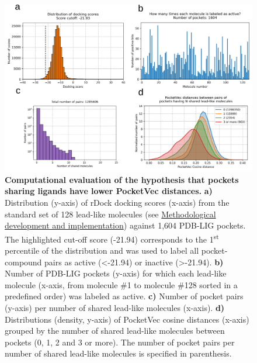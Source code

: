 \begin{figure}[htbp]
  \centering
  \includegraphics[width=1\linewidth]{figures/PocketVec/Supplementary/FigS26.png} 
  \caption{
  \textbf{Computational evaluation of the hypothesis that pockets sharing ligands have lower PocketVec distances.}
  \textbf{a)} Distribution (y-axis) of rDock\cite{ruiz-carmona_rdock_2014} docking scores (x-axis) from the standard set of 128 lead-like molecules (see \hyperref[PocketVec_MethDevAndImp]{Methodological development and implementation}) against 1,604 PDB-LIG pockets. The highlighted cut-off score (-21.94) corresponds to the 1\textsuperscript{st} percentile of the distribution and was used to label all pocket-compound pairs as active (<-21.94) or inactive (>-21.94).
  \textbf{b)} Number of PDB-LIG pockets (y-axis) for which each lead-like molecule (x-axis, from molecule \#1 to molecule \#128 sorted in a predefined order) was labeled as active.
  \textbf{c)} Number of pocket pairs (y-axis) per number of shared lead-like molecules (x-axis).
  \textbf{d)} Distributions (density, y-axis) of PocketVec cosine distances (x-axis) grouped by the number of shared lead-like molecules between pockets (0, 1, 2 and 3 or more). The number of pocket pairs per number of shared lead-like molecules is specified in parenthesis. 
  }
  \label{PocketVec_FigS26}
\end{figure}



